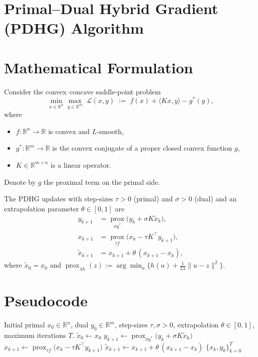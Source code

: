 \documentclass[11pt]{article}
\newcommand{\prox}{\operatorname{prox}}
\begin{document}
\section*{Primal–Dual Hybrid Gradient (PDHG) Algorithm}

\section*{Mathematical Formulation}
Consider the convex–concave saddle‑point problem  
\[
\min_{x\in\mathbb{R}^n}\max_{y\in\mathbb{R}^m}
\; \mathcal{L}(x,y)\;:=\; f(x)+\langle Kx ,y\rangle - g^{*}(y),
\tag{1}
\]
where  

\begin{itemize}[nosep]
\item $f:\mathbb{R}^n\to\mathbb{R}$ is convex and $L$‑smooth,
\item $g^{*}:\mathbb{R}^m\to\mathbb{R}$ is the convex conjugate of a proper closed convex function $g$,
\item $K\in\mathbb{R}^{m\times n}$ is a linear operator.
\end{itemize}
Denote by $g$ the proximal term on the primal side.  

The PDHG updates with step‑sizes $\tau>0$ (primal) and $\sigma>0$ (dual) and an extrapolation parameter $\theta\in[0,1]$ are  
\[
\boxed{
\begin{aligned}
y_{k+1}&=\operatorname*{prox}_{\sigma g^{*}}\!\bigl(y_k+\sigma K\tilde x_k\bigr),\\[4pt]
x_{k+1}&=\operatorname*{prox}_{\tau f}\!\bigl(x_k-\tau K^{\!\top} y_{k+1}\bigr),\\[4pt]
\tilde x_{k+1}&=x_{k+1}+\theta\,(x_{k+1}-x_k),
\end{aligned}}
\tag{2}
\]
where $\tilde x_0=x_0$ and $\operatorname*{prox}_{\lambda h}(z):=\arg\min_{u}\bigl\{h(u)+\frac{1}{2\lambda}\|u-z\|^{2}\bigr\}$.

\section*{Pseudocode}
\begin{algorithm}[H]
\caption{Primal–Dual Hybrid Gradient (PDHG)}\label{alg:pdhg}
\begin{algorithmic}[1]
\REQUIRE Initial primal $x_0\in\mathbb{R}^n$, dual $y_0\in\mathbb{R}^m$, step‑sizes $\tau,\sigma>0$, extrapolation $\theta\in[0,1]$, maximum iterations $T$.
\STATE $\tilde x_0\gets x_0$
    \STATE $y_{k+1}\gets \prox_{\sigma g^{*}}\!\bigl(y_k+\sigma K\tilde x_k\bigr)$ \hfill{}
    \STATE $x_{k+1}\gets \prox_{\tau f}\!\bigl(x_k-\tau K^{\!\top} y_{k+1}\bigr)$ \hfill{}
    \STATE $\tilde x_{k+1}\gets x_{k+1}+\theta\,(x_{k+1}-x_k)$ \hfill{}
\ENDFOR
\RETURN $\{x_k,y_k\}_{k=0}^{T}$
\end{algorithmic}
\end{algorithm}
\end{document}
